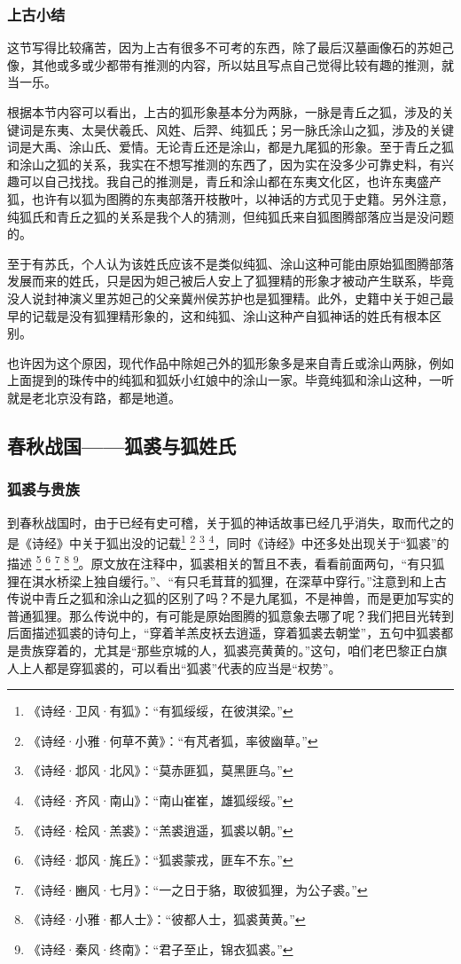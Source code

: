 \documentclass[UTF8, 12pt, A4paper]{article}
\begin{document}
\subsubsection{上古小结}

这节写得比较痛苦，因为上古有很多不可考的东西，除了最后汉墓画像石的苏妲己像，其他或多或少都带有推测的内容，所以姑且写点自己觉得比较有趣的推测，就当一乐。

根据本节内容可以看出，上古的狐形象基本分为两脉，一脉是青丘之狐，涉及的关键词是东夷、太昊伏羲氏、风姓、后羿、纯狐氏；另一脉氏涂山之狐，涉及的关键词是大禹、涂山氏、爱情。无论青丘还是涂山，都是九尾狐的形象。至于青丘之狐和涂山之狐的关系，我实在不想写推测的东西了，因为实在没多少可靠史料，有兴趣可以自己找找。我自己的推测是，青丘和涂山都在东夷文化区，也许东夷盛产狐，也许有以狐为图腾的东夷部落开枝散叶，以神话的方式见于史籍。另外注意，纯狐氏和青丘之狐的关系是我个人的猜测，但纯狐氏来自狐图腾部落应当是没问题的。

至于有苏氏，个人认为该姓氏应该不是类似纯狐、涂山这种可能由原始狐图腾部落发展而来的姓氏，只是因为妲己被后人安上了狐狸精的形象才被动产生联系，毕竟没人说封神演义里苏妲己的父亲冀州侯苏护也是狐狸精。此外，史籍中关于妲己最早的记载是没有狐狸精形象的，这和纯狐、涂山这种产自狐神话的姓氏有根本区别。

也许因为这个原因，现代作品中除妲己外的狐形象多是来自青丘或涂山两脉，例如上面提到的珠传中的纯狐和狐妖小红娘中的涂山一家。毕竟纯狐和涂山这种，一听就是老北京没有路，都是地道。


\subsection{春秋战国——狐裘与狐姓氏}

\subsubsection{狐裘与贵族}

到春秋战国时，由于已经有史可稽，关于狐的神话故事已经几乎消失，取而代之的是《诗经》中关于狐出没的记载\footnote{《诗经·卫风·有狐》：“有狐绥绥，在彼淇梁。”} \footnote{《诗经·小雅·何草不黄》：“有芃者狐，率彼幽草。”} \footnote{《诗经·邶风·北风》：“莫赤匪狐，莫黑匪乌。”} \footnote{《诗经·齐风·南山》：“南山崔崔，雄狐绥绥。”}，同时《诗经》中还多处出现关于“狐裘”的描述 \footnote{《诗经·桧风·羔裘》：“羔裘逍遥，狐裘以朝。”} \footnote{《诗经·邶风·旄丘》：“狐裘蒙戎，匪车不东。”} \footnote{《诗经·豳风·七月》：“一之日于貉，取彼狐狸，为公子裘。”} \footnote{《诗经·小雅·都人士》：“彼都人士，狐裘黄黄。”} \footnote{《诗经·秦风·终南》：“君子至止，锦衣狐裘。”}。原文放在注释中，狐裘相关的暂且不表，看看前面两句，“有只狐狸在淇水桥梁上独自缓行。”、“有只毛茸茸的狐狸，在深草中穿行。”注意到和上古传说中青丘之狐和涂山之狐的区别了吗？不是九尾狐，不是神兽，而是更加写实的普通狐狸。那么传说中的，有可能是原始图腾的狐意象去哪了呢？我们把目光转到后面描述狐裘的诗句上，“穿着羊羔皮袄去逍遥，穿着狐裘去朝堂”，五句中狐裘都是贵族穿着的，尤其是“那些京城的人，狐裘亮黄黄的。”这句，咱们老巴黎正白旗人上人都是穿狐裘的，可以看出“狐裘”代表的应当是“权势”。
\end{document}
